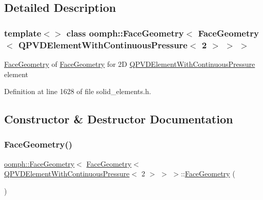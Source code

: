 \subsection{Detailed Description}
\subsubsection*{template$<$$>$\newline
class oomph\+::\+Face\+Geometry$<$ Face\+Geometry$<$ Q\+P\+V\+D\+Element\+With\+Continuous\+Pressure$<$ 2 $>$ $>$ $>$}

\hyperlink{classoomph_1_1FaceGeometry}{Face\+Geometry} of \hyperlink{classoomph_1_1FaceGeometry}{Face\+Geometry} for 2D \hyperlink{classoomph_1_1QPVDElementWithContinuousPressure}{Q\+P\+V\+D\+Element\+With\+Continuous\+Pressure} element 

Definition at line 1628 of file solid\+\_\+elements.\+h.



\subsection{Constructor \& Destructor Documentation}
\mbox{\label{classoomph_1_1FaceGeometry_3_01FaceGeometry_3_01QPVDElementWithContinuousPressure_3_012_01_4_01_4_01_4_a21abe926021d8f282853ea03ddb09a38}} 
\subsubsection{\texorpdfstring{Face\+Geometry()}{FaceGeometry()}}
{\footnotesize\ttfamily \hyperlink{classoomph_1_1FaceGeometry}{oomph\+::\+Face\+Geometry}$<$ \hyperlink{classoomph_1_1FaceGeometry}{Face\+Geometry}$<$ \hyperlink{classoomph_1_1QPVDElementWithContinuousPressure}{Q\+P\+V\+D\+Element\+With\+Continuous\+Pressure}$<$ 2 $>$ $>$ $>$\+::\hyperlink{classoomph_1_1FaceGeometry}{Face\+Geometry} (\begin{DoxyParamCaption}{ }\end{DoxyParamCaption})\hspace{0.3cm}{\ttfamily [inline]}}



